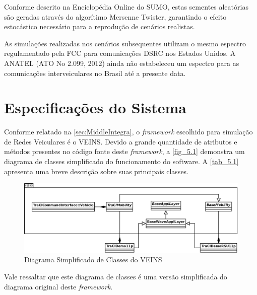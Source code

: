 \documentclass[
12pt,				%
openright,			%
oneside,			%
a4paper,			%
brazil,				%
]{abntex2}
\begin{document}
	\par Conforme descrito na Enciclopédia Online do SUMO, estas sementes aleatórias são geradas através do algorítimo Mersenne Twister, garantindo o efeito estocástico necessário para a reprodução de cenários realistas.

	\par As simulações realizadas nos cenários subsequentes utilizam o mesmo espectro regulamentado pela FCC para comunicações DSRC nos Estados Unidos. A ANATEL (ATO No 2.099, 2012) ainda não estabeleceu um espectro para as comunicações interveiculares no Brasil até a presente data.

	\section{Especificações do Sistema}

   	\par Conforme relatado na \autoref{sec:MiddleIntegra}, o \textit{framework} escolhido para simulação de Redes Veiculares é o VEINS. Devido a grande quantidade de atributos e métodos presentes no código fonte deste \textit{framework}, a \autoref{fig_5.1} demonstra um diagrama de classes simplificado do funcionamento do software. A \autoref{tab_5.1} apresenta uma breve descrição sobre suas principais classes.

	 \begin{figure} [H]
	  \centering
	  \includegraphics[scale=.43]{figuras/cap5/51ClassesVEINS}
	  \caption{\label{fig_5.1}Diagrama Simplificado de Classes do VEINS}
	 \end{figure}
	
   	\par Vale ressaltar que este diagrama de classes é uma versão simplificada do diagrama original deste \textit{framework}.
   		
\end{document}
